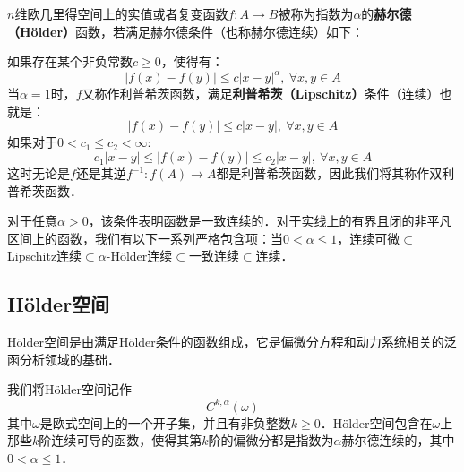 \begin{issues}
\issueDraft
\end{issues}
$n$维欧几里得空间上的实值或者复变函数$f:A \rightarrow B$被称为指数为$\alpha$的\textbf{赫尔德（Hölder）}函数，若满足赫尔德条件（也称赫尔德连续）如下：

如果存在某个非负常数$c\geq 0$，使得有：
\begin{equation}
|f(x)-f(y)|\leq c|x-y|^\alpha,\ \forall x,y \in A
\end{equation}
当$\alpha=1$时，$f$又称作利普希茨函数，满足\textbf{利普希茨（Lipschitz）}条件（连续）也就是：
\begin{equation}
|f(x)-f(y)|\leq c|x-y|,\ \forall x,y \in A
\end{equation}
如果对于$0<c_1\leq c_2<\infty $:
\begin{equation}
c_1|x-y|\leq |f(x)-f(y)|\leq  c_2|x-y|,\ \forall x,y \in A
\end{equation}
这时无论是$f$还是其逆$f^{-1}:f(A)\rightarrow A$都是利普希茨函数，因此我们将其称作双利普希茨函数．

对于任意$\alpha > 0$，该条件表明函数是一致连续的．对于实线上的有界且闭的非平凡区间上的函数，我们有以下一系列严格包含项：当$0<\alpha\leq 1$，连续可微$\subset$Lipschitz连续$\subset\alpha$-Hölder连续$\subset$一致连续$\subset$连续．
\subsection{Hölder空间}
Hölder空间是由满足Hölder条件的函数组成，它是偏微分方程和动力系统相关的泛函分析领域的基础．

我们将Hölder空间记作
\begin{equation}
C^{k,\alpha}(\omega)
\end{equation}
其中$\omega$是欧式空间上的一个开子集，并且有非负整数$k\geq 0$．Hölder空间包含在$\omega$上那些$k$阶连续可导的函数，使得其第$k$阶的偏微分都是指数为$\alpha$赫尔德连续的，其中$0<\alpha\leq 1$．
